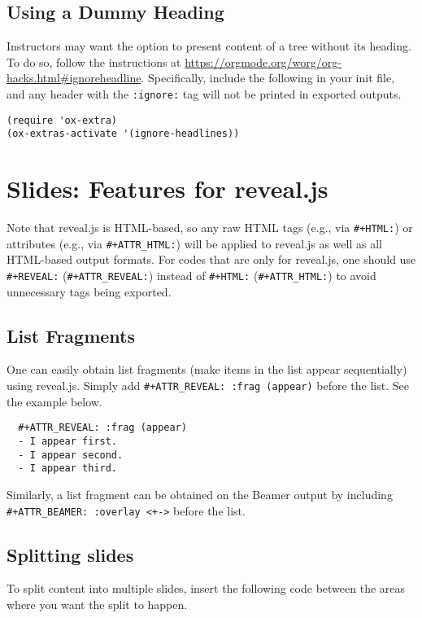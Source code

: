 \documentclass[10pt,article]{article}
\begin{document}
\subsection{Using a Dummy Heading}
\label{sec:org4d2f0aa}
Instructors may want the option to present content of a tree without its heading. To do so, follow the instructions at
\url{https://orgmode.org/worg/org-hacks.html\#ignoreheadline}. Specifically, include the
following in your init file, and any header with the \texttt{:ignore:} tag will not be printed in exported outputs.

\begin{verbatim}
(require 'ox-extra)
(ox-extras-activate '(ignore-headlines))
\end{verbatim}
\section{Slides: Features for reveal.js}
\label{sec:orgb1dabfe}
\begin{mdframed}
Note that reveal.js is HTML-based, so any raw HTML tags (e.g., via \texttt{\#+HTML:})
or attributes (e.g., via \texttt{\#+ATTR\_HTML:}) will be applied to reveal.js as well
as all HTML-based output formats.  For codes that are only for reveal.js, one
should use \texttt{\#+REVEAL:} (\texttt{\#+ATTR\_REVEAL:}) instead of \texttt{\#+HTML:}
(\texttt{\#+ATTR\_HTML:}) to avoid unnecessary tags being exported.
\end{mdframed}

\subsection{List Fragments}
\label{sec:orgc4d58c2}
One can easily obtain list fragments (make items in the list appear
sequentially) using reveal.js. Simply add \texttt{\#+ATTR\_REVEAL: :frag
(appear)} before the list. See the example below.

\begin{verbatim}
  #+ATTR_REVEAL: :frag (appear)
  - I appear first.
  - I appear second.
  - I appear third.
\end{verbatim}

\begin{mdframed}
Similarly, a list fragment can be obtained on the Beamer output by including
\texttt{\#+ATTR\_BEAMER: :overlay <+->} before the list.
\end{mdframed}

\subsection{Splitting slides}
\label{sec:orga54b690}
To split content into multiple slides, insert the following code between the areas where you want the split to happen.
\end{document}
